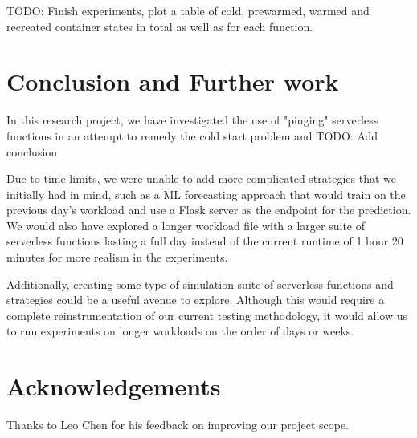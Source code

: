 \documentclass{article}
\begin{document}
TODO: Finish experiments, plot a table of cold, prewarmed, warmed and recreated container states in total as well as for each function.

\section{Conclusion and Further work}

In this research project, we have investigated the use of "pinging" serverless functions in an attempt to remedy the cold start problem and TODO: Add conclusion

Due to time limits, we were unable to add more complicated strategies that we initially had in mind, such as a ML forecasting approach that would train on the previous day's workload and use a Flask server as the endpoint for the prediction. We would also have explored a longer workload file with a larger suite of serverless functions lasting a full day instead of the current runtime of 1 hour 20 minutes for more realism in the experiments.

Additionally, creating some type of simulation suite of serverless functions and strategies could be a useful avenue to explore. Although this would require a complete reinstrumentation of our current testing methodology, it would allow us to run experiments on longer workloads on the order of days or weeks.

\section{Acknowledgements}

Thanks to Leo Chen for his feedback on improving our project scope.



\end{document}
